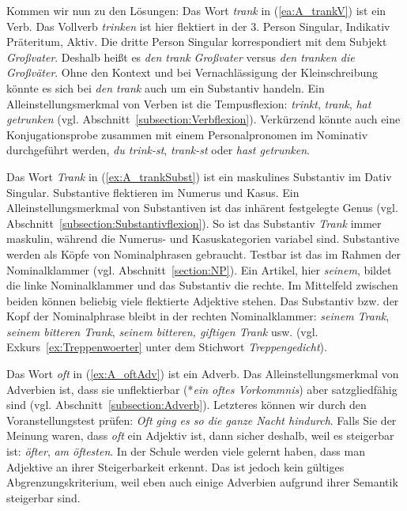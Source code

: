 Kommen wir nun zu den Lösungen: Das Wort \textit{trank} in (\ref{ea:A_trankV}) ist ein Verb. Das Vollverb \textit{trinken} ist hier flektiert in der 3. Person Singular, Indikativ Präteritum, Aktiv. Die dritte Person Singular korrespondiert mit dem Subjekt \textit{Großvater}. Deshalb heißt es \textit{den trank Großvater} versus \textit{den tranken die Großväter}. Ohne den Kontext und bei Vernachlässigung der Kleinschreibung könnte es sich bei \textit{den trank} auch um ein Substantiv handeln. Ein Alleinstellungsmerkmal von Verben ist die Tempusflexion: \textit{trinkt}, \textit{trank}, \textit{hat getrunken} (vgl. Abschnitt~\ref{subsection:Verbflexion}). Verkürzend könnte auch eine Konjugationsprobe zusammen mit einem Personalpronomen im Nominativ durchgeführt werden, \zB \textit{du trink-st}, \textit{trank-st} oder \textit{hast getrunken}. 

Das Wort \textit{Trank} in (\ref{ex:A_trankSubst}) ist ein maskulines Substantiv im Dativ Singular. Substantive flektieren im Numerus und Kasus. Ein Alleinstellungsmerkmal von Substantiven ist das inhärent festgelegte Genus (vgl. Abschnitt~\ref{subsection:Substantivflexion}). So ist das Substantiv \textit{Trank} immer maskulin, während die Numerus- und Kasuskategorien variabel sind. Substantive werden als Köpfe von Nominalphrasen gebraucht. Testbar ist das im Rahmen der Nominalklammer (vgl. Abschnitt~\ref{section:NP}). Ein Artikel, hier \textit{seinem}, bildet die linke Nominalklammer und das Substantiv die rechte. Im Mittelfeld zwischen beiden können beliebig viele flektierte Adjektive stehen. Das Substantiv bzw. der Kopf der Nominalphrase bleibt in der rechten Nominalklammer: \textit{seinem Trank}, \textit{seinem bitteren Trank}, \textit{seinem bitteren, giftigen Trank} usw. (vgl. Exkurs~\ref{ex:Treppenwoerter} unter dem Stichwort \textit{Treppengedicht}).

Das Wort \textit{oft} in (\ref{ex:A_oftAdv}) ist ein Adverb. Das Alleinstellungsmerkmal von Adverbien ist, dass sie unflektierbar (*\textit{ein oftes Vorkommnis}) aber satzgliedfähig sind (vgl. Abschnitt~\ref{subsection:Adverb}). Letzteres können wir durch den Voranstellungstest prüfen: \textit{Oft ging es so die ganze Nacht hindurch}. Falls Sie der Meinung waren, dass \textit{oft} ein Adjektiv ist, dann sicher deshalb, weil es steigerbar ist: \textit{öfter}, \textit{am öftesten}. In der Schule werden viele gelernt haben, dass man Adjektive an ihrer Steigerbarkeit erkennt. Das ist jedoch kein gültiges Abgrenzungskriterium, weil eben auch einige Adverbien aufgrund ihrer Semantik steigerbar sind.

